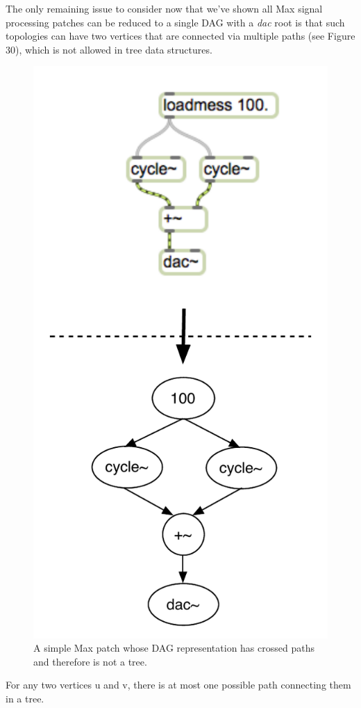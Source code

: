 \documentclass[12pt]{report} 	%
\numberwithin{figure}{chapter}
\numberwithin{table}{chapter}
\numberwithin{equation}{chapter}
\begin{document}
\begin{flushleft}
The only remaining issue to consider now that we've shown all Max signal processing patches can be reduced to a single DAG with a \textit{dac\texttildelow{}} root is that such topologies can  have two vertices that are connected via multiple paths (see Figure 30), which is not allowed in tree data structures.
\begin{figure}[h!]
\begin{center}
\includegraphics[scale=0.8]{MaxDAGsCrossedPaths}
\caption[A DAG with crossed paths]{A simple Max patch whose DAG representation has crossed paths and therefore is not a tree.}
\end{center}
\end{figure}
For any two vertices u and v, there is at most one possible path connecting them in a tree. 


\end{flushleft}
\end{document}
